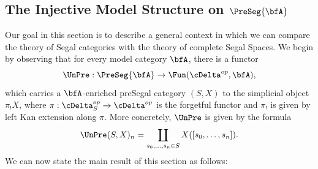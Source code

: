 \subsection{The Injective Model Structure on \texorpdfstring{$\PreSeg{\bfA}$}{PreSeg\_A}}\label{bisec2.3}

Our goal in this section is to describe a general context in which we can compare
the theory of Segal categories with the theory of complete Segal Spaces.
We begin by observing that for every model category $\bfA$, there
is a functor
$$ \UnPre: \PreSeg{\bfA} \rightarrow \Fun( \cDelta^{op}, \bfA),$$
which carries a $\bfA$-enriched preSegal category $(S,X)$ to the simplicial object
$\pi_{!} X$, where $\pi: \cDelta^{op}_{S} \rightarrow \cDelta^{op}$ is the forgetful functor
and $\pi_{!}$ is given by left Kan extension along $\pi$. More concretely, 
$\UnPre$ is given by the formula
$$ \UnPre(S,X)_{n} = \coprod_{ s_0, \ldots, s_n \in S} X( [s_0, \ldots, s_n] ).$$
We can now state the main result of this section as follows:


